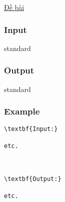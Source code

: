 

\href{https://drive.google.com/file/d/0B5XsVAuisVfpdC15akZNbTNJOVU/view}{ Đề bài }

\subsubsection{Input}

standard

\subsubsection{Output}

standard

\subsubsection{Example}
\begin{verbatim}
\textbf{Input:}

etc.



\textbf{Output:}

etc.

\end{verbatim}